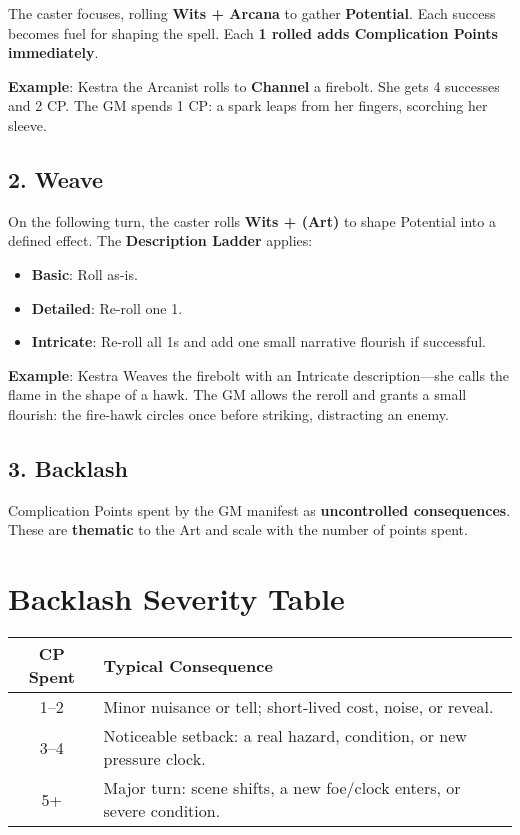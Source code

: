 The caster focuses, rolling \textbf{Wits + Arcana} to gather \textbf{Potential}. Each success becomes fuel for shaping the spell. Each \textbf{1 rolled adds Complication Points immediately}.

\textbf{Example}: Kestra the Arcanist rolls to \textbf{Channel} a firebolt. She gets 4 successes and 2 CP. The GM spends 1 CP: a spark leaps from her fingers, scorching her sleeve.

\subsection*{2. Weave}

On the following turn, the caster rolls \textbf{Wits + (Art)} to shape Potential into a defined effect. The \textbf{Description Ladder} applies:

\begin{itemize}
    \item \textbf{Basic}: Roll as-is.
    \item \textbf{Detailed}: Re-roll one 1.
    \item \textbf{Intricate}: Re-roll all 1s and add one small narrative flourish if successful.
\end{itemize}

\textbf{Example}: Kestra Weaves the firebolt with an Intricate description—she calls the flame in the shape of a hawk. The GM allows the reroll and grants a small flourish: the fire-hawk circles once before striking, distracting an enemy.

\subsection*{3. Backlash}

Complication Points spent by the GM manifest as \textbf{uncontrolled consequences}. These are \textbf{thematic} to the Art and scale with the number of points spent.

\section*{Backlash Severity Table}

\begin{tabular}{|c|l|}
\hline
\textbf{CP Spent} & \textbf{Typical Consequence} \\
\hline
1–2 & Minor nuisance or tell; short-lived cost, noise, or reveal. \\
3–4 & Noticeable setback: a real hazard, condition, or new pressure clock. \\
5+ & Major turn: scene shifts, a new foe/clock enters, or severe condition. \\
\hline
\end{tabular}

